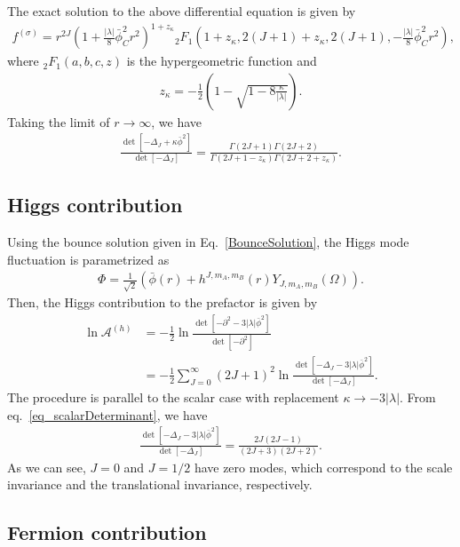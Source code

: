 \documentclass[12pt]{article}
\begin{document}
The exact solution to the above differential equation is given by
\begin{align}
 f^{(\sigma)} = r^{2J}
 \left(
  1+\frac{|\lambda|}{8}\bar\phi_C^2r^2
 \right)^{1+z_\kappa}{}_2F_1
 \left(
  1+z_\kappa,2(J+1)+z_\kappa,2(J+1),-\frac{|\lambda|}{8}\bar\phi_C^2r^2
 \right),
\end{align}
where ${}_2F_1(a,b,c,z)$ is the hypergeometric function and
\begin{align}
 z_\kappa = -\frac{1}{2}
 \left(
  1-\sqrt{1-8\frac{\kappa}{|\lambda|}}
 \right).
\end{align}
Taking the limit of $r\to\infty$, we have
\begin{align}
 \frac{\det[-\Delta_J+\kappa\bar\phi^2]}{\det[-\Delta_J]}
 = \frac{\Gamma(2J+1)\Gamma(2J+2)}{\Gamma(2J+1-z_\kappa)\Gamma(2J+2+z_\kappa)}.
 \label{eq_scalarDeterminant}
\end{align}

\subsection{Higgs contribution}

Using the bounce solution given in Eq.\ \eqref{BounceSolution}, the
Higgs mode fluctuation is parametrized as
\begin{align}
 \Phi = \frac{1}{\sqrt{2}}
 \left( 
   \bar\phi(r)+h^{J,m_A,m_B}(r)Y_{J,m_A,m_B}(\Omega)
 \right).
\end{align}
Then, the Higgs contribution to the prefactor is given by
\begin{align}
 \ln\mathcal A^{(h)}
  & = -\frac{1}{2}\ln\frac{\det[-\partial^2-3|\lambda|\bar\phi^2]}{\det[-\partial^2]}\nonumber              \\
  & = -\frac{1}{2}\sum_{J=0}^\infty(2J+1)^2\ln\frac{\det[-\Delta_J-3|\lambda|\bar\phi^2]}{\det[-\Delta_J]}.
\end{align}
The procedure is parallel to the scalar case with replacement
$\kappa\to-3|\lambda|$. From eq.~\eqref{eq_scalarDeterminant}, we have
\begin{align}
 \frac{\det[-\Delta_J-3|\lambda|\bar\phi^2]}{\det[-\Delta_J]}
 = \frac{2J(2J-1)}{(2J+3)(2J+2)}.
\end{align}
As we can see, $J = 0$ and $J = 1/2$ have zero modes, which correspond
to the scale invariance and the translational invariance, respectively.

\subsection{Fermion contribution}
\end{document}
